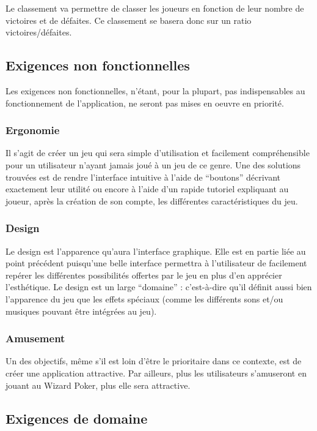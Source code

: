 \documentclass[11pt,a4paper]{article}
\begin{document}
Le classement va permettre de classer les joueurs en fonction de
leur nombre de victoires et de défaites. Ce classement se
basera donc sur un ratio victoires/défaites.


\subsection{Exigences non fonctionnelles}
\label{sec:exi-nonfonc}

Les exigences non fonctionnelles, n'étant, pour la plupart, pas indispensables au fonctionnement de l'application, ne seront pas mises en oeuvre en priorité.


\subsubsection*{Ergonomie}
Il s'agit de créer un jeu qui sera simple d'utilisation et facilement compréhensible pour un utilisateur n'ayant jamais joué à un jeu de ce genre.
\medbreak
Une des solutions trouvées est de rendre l'interface intuitive à l'aide de ``boutons'' décrivant exactement leur utilité ou encore à l'aide d'un rapide tutoriel expliquant au joueur, après la création de son compte, les différentes caractéristiques du jeu.


\subsubsection*{Design}
Le design est l'apparence qu'aura l'interface graphique. Elle est en partie liée au point précédent puisqu'une belle interface permettra à l'utilisateur de facilement repérer les différentes possibilités offertes par le jeu en plus d'en apprécier l'esthétique.
\medbreak
Le design est un large ``domaine'' : c'est-à-dire qu'il définit aussi bien l'apparence du jeu  que les effets spéciaux (comme les différents sons et/ou musiques pouvant être intégrées au jeu).


\subsubsection*{Amusement}
Un des objectifs, même s'il est loin d'être le prioritaire dans ce contexte, est de créer une application attractive. Par ailleurs, plus les utilisateurs s'amuseront en jouant au Wizard Poker, plus elle sera attractive.


\subsection{Exigences de domaine}
\label{sec:exi-dom}
\end{document}
